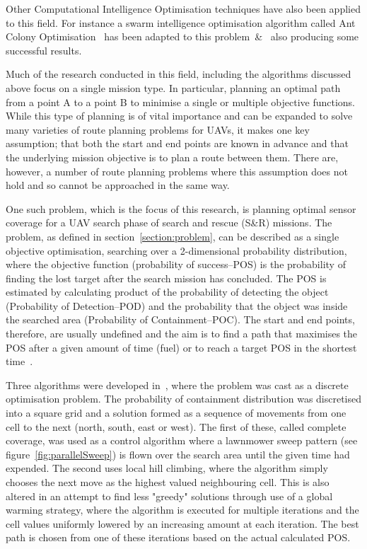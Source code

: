 \documentclass[10pt,a4paper, oneside, conference]{IEEEtran}
\begin{document}
	Other Computational Intelligence Optimisation techniques have also been applied to this field. For instance a swarm intelligence optimisation algorithm called Ant Colony Optimisation~\cite{Dorigo2006} has been adapted to this problem~\cite{Zhang2016}\&~\cite{Wang2017} also producing some successful results. 
	
	Much of the research conducted in this field, including the algorithms discussed above focus on a single mission type. 
	In particular, planning an optimal path from a point A to a point B to minimise a single or multiple objective functions.
	While this type of planning is of vital importance and can be expanded to solve many varieties of route planning problems for UAVs, it makes one key assumption; that both the start and end points are known in advance and that the underlying mission objective is to plan a route between them. 
	There are, however, a number of route planning problems where this assumption does not hold and so cannot be approached in the same way.
	 
	One such problem, which is the focus of this research, is planning optimal sensor coverage for a UAV search phase of search and rescue (S\&R) missions.
	The problem, as defined in section~\ref{section:problem}, can be described as a single objective optimisation, searching over a 2-dimensional probability distribution, where the objective function (probability of success--POS) is the probability of finding the lost target after the search mission has concluded.
	The POS is estimated by calculating product of the probability of detecting the object (Probability of Detection--POD) and the probability that the object was inside the searched area (Probability of Containment--POC).
	The start and end points, therefore, are usually undefined and the aim is to find a path that maximises the POS after a given amount of time (fuel) or to reach a target POS in the shortest time~\cite{Lin2014}.
		
	Three algorithms were developed in~\cite{Lin2009}, where the problem was cast as a discrete optimisation problem.
	The probability of containment distribution was discretised into a square grid and a solution formed as a sequence of movements from one cell to the next (north, south, east or west).
	The first of these, called complete coverage, was used as a control algorithm where a lawnmower sweep pattern (see figure~\ref{fig:parallelSweep}) is flown over the search area until the given time had expended.
	The second uses local hill climbing, where the algorithm simply chooses the next move as the highest valued neighbouring cell.
	This is also altered in an attempt to find less "greedy" solutions through use of a global warming strategy, where the algorithm is executed for multiple iterations and the cell values uniformly lowered by an increasing amount at each iteration. The best path is chosen from one of these iterations based on the actual calculated POS.
	
\end{document}

